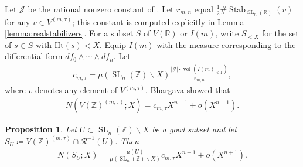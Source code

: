 \documentclass{article} %
\newtheorem{proposition}{Proposition}[section]
\numberwithin{equation}{section}
\DeclareMathOperator{\SL}{SL}
\DeclareMathOperator{\Vol}{vol}
\DeclareMathOperator{\Stab}{Stab}
\newcommand{\R}{\mathbb{R}}
\newcommand{\Z}{\mathbb{Z}}
\newcommand{\height}{\mathrm{Ht}}
\begin{document}
Let $\mathcal{J}$ be the rational nonzero constant of \cite[Proposition 16]{bhargava2015mosthyperellipticarepointless}.
Let $r_{m,n}$ equal $\frac{1}{2}\#\Stab_{\SL_n(\R)}(v)$ for any $v\in V^{(m,\tau)}$; this constant is computed explicitly in Lemma \ref{lemma:realstabilizers}.
For a subset $S$ of $V(\R)$ or $I(m)$, write $S_{<X}$ for the set of $s\in S$ with $\height(s)<X$.
Equip $I(m)$ with the measure corresponding to the differential form $df_0\wedge \cdots \wedge df_n$.
Let 
\begin{align*}
    c_{m,\tau} = \mu(\SL_n(\Z)\backslash X)\frac{|\mathcal{J}| \cdot  \Vol(I(m)_{<1})}{r_{m,n}},
\end{align*}
where $v$ denotes any element of $V^{(m,\tau)}$.
Bhargava \cite[Theorem 9]{bhargava2015mosthyperellipticarepointless} showed that 
\begin{align}\label{equation_averageorbitslocalversion}
    N(V(\Z)^{(m,\tau)};X) = c_{m,\tau} X^{n+1} + o(X^{n+1}).
\end{align}
\begin{proposition}\label{prop_equidistribution_realcomponent}
    Let $U\subset \SL_n(\Z)\backslash X$ be a good subset and let $S_U \coloneqq V(\Z)^{(m,\tau)} \cap \mathcal{R}^{-1}(U)$.
    Then 
    \begin{align}\label{equation_equidistribution_realcomponent}
    N(S_U;X) = \frac{\mu(U)}{\mu(\SL_n(\Z)\backslash X)} c_{m,\tau} X^{n+1} + o(X^{n+1}).
\end{align}
\end{proposition}
\end{document}
